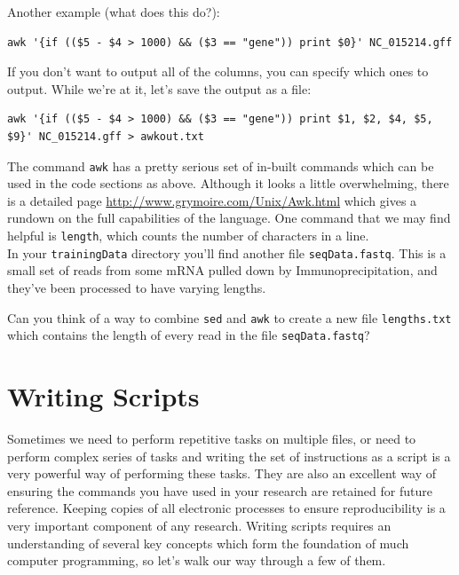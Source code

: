 \documentclass[a4paper,12pt,twoside]{memoir}
\begin{document}
\begin{steps}
Another example (what does this do?): \\
\begin{lstlisting}
awk '{if (($5 - $4 > 1000) && ($3 == "gene")) print $0}' NC_015214.gff 
\end{lstlisting}
If you don't want to output all of the columns, you can specify which ones to output.  
While we're at it, let's save the output as a file: \\
\begin{lstlisting}
awk '{if (($5 - $4 > 1000) && ($3 == "gene")) print $1, $2, $4, $5, $9}' NC_015214.gff > awkout.txt
\end{lstlisting}
\end{steps}

\begin{advanced}
The command \texttt{awk} has a pretty serious set of in-built commands which can be used in the code sections as above.
Although it looks a little overwhelming, there is a detailed page \url{http://www.grymoire.com/Unix/Awk.html} which gives a rundown on the full capabilities of the language.
One command that we may find helpful is \texttt{length}, which counts the number of characters in a line. \\

In your \texttt{trainingData} directory you'll find another file \texttt{seqData.fastq}.
This is a small set of reads from some mRNA pulled down by Immunoprecipitation, and they've been processed to have varying lengths.

\begin{questions}
Can you think of a way to combine \texttt{sed} and \texttt{awk} to create a new file \texttt{lengths.txt} which contains the length of every read in the file \texttt{seqData.fastq}?
\end{questions}
\begin{answer}}
\texttt{sed -n `2\~{}4p' seqData.fastq | awk `\{print length(\$1)\}' > lengths.txt}
\end{answer}
\end{advanced}



\chapter{Writing Scripts}
Sometimes we need to perform repetitive tasks on multiple files, or need to perform complex series of tasks and writing the set of instructions as a script is a very powerful way of performing these tasks.
They are also an excellent way of ensuring the commands you have used in your research are retained for future reference.
Keeping copies of all electronic processes to ensure reproducibility is a very important component of any research. 
Writing scripts requires an understanding of several key concepts which form the foundation of much computer programming, so let's walk our way through a few of them. \\
\end{document}
